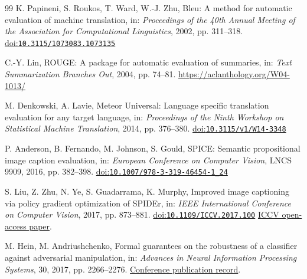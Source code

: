 \documentclass[10pt,a4paper,twocolumn]{article}
\providecommand{\doi}[1]{%
  \href{https://doi.org/#1}{doi:\nolinkurl{#1}}}
\begin{document}
\begin{thebibliography}{99}
K. Papineni, S. Roukos, T. Ward, W.-J. Zhu,
Bleu: A method for automatic evaluation of machine translation,
in: \emph{Proceedings of the 40th Annual Meeting of the
Association for Computational Linguistics}, 2002, pp. 311--318.
\doi{10.3115/1073083.1073135}

C.-Y. Lin,
ROUGE: A package for automatic evaluation of summaries,
in: \emph{Text Summarization Branches Out}, 2004, pp. 74--81.
\url{https://aclanthology.org/W04-1013/}

M. Denkowski, A. Lavie,
Meteor Universal: Language specific translation evaluation
for any target language,
in: \emph{Proceedings of the Ninth Workshop on Statistical
Machine Translation}, 2014, pp. 376--380.
\doi{10.3115/v1/W14-3348}

P. Anderson, B. Fernando, M. Johnson, S. Gould,
SPICE: Semantic propositional image caption evaluation,
in: \emph{European Conference on Computer Vision}, LNCS 9909, 2016, pp. 382--398.
\doi{10.1007/978-3-319-46454-1_24}

S. Liu, Z. Zhu, N. Ye, S. Guadarrama, K. Murphy,
Improved image captioning via policy gradient optimization of SPIDEr,
in: \emph{IEEE International Conference on Computer Vision},
2017, pp. 873--881.
\doi{10.1109/ICCV.2017.100}
\href{https://openaccess.thecvf.com/content_iccv_2017/html/Liu_Improved_Image_Captioning_ICCV_2017_paper.html}
{ICCV open-access paper}.


M. Hein, M. Andriushchenko,
Formal guarantees on the robustness of a classifier against
adversarial manipulation,
in: \emph{Advances in Neural Information Processing Systems},
30, 2017, pp. 2266--2276.
\href{https://proceedings.neurips.cc/paper/2017/hash/e077e1a544eec4f0307cf5c3c721d944-Abstract.html}
{Conference publication record}.

\end{thebibliography}

\endgroup
\end{document}
